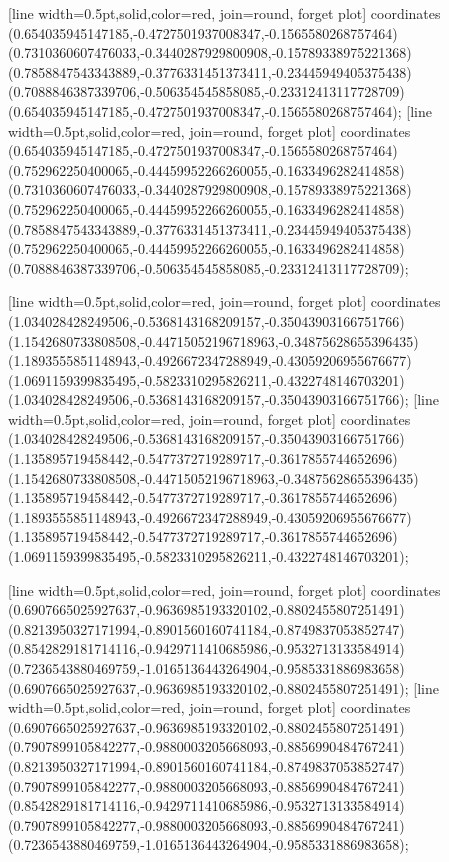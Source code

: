 [line width=0.5pt,solid,color=red, join=round, forget plot] coordinates {(0.654035945147185,-0.4727501937008347,-0.1565580268757464) (0.7310360607476033,-0.3440287929800908,-0.15789338975221368) (0.7858847543343889,-0.3776331451373411,-0.23445949405375438) (0.7088846387339706,-0.506354545858085,-0.23312413117728709) (0.654035945147185,-0.4727501937008347,-0.1565580268757464)};
[line width=0.5pt,solid,color=red, join=round, forget plot] coordinates {(0.654035945147185,-0.4727501937008347,-0.1565580268757464) (0.752962250400065,-0.44459952266260055,-0.1633496282414858) (0.7310360607476033,-0.3440287929800908,-0.15789338975221368) (0.752962250400065,-0.44459952266260055,-0.1633496282414858) (0.7858847543343889,-0.3776331451373411,-0.23445949405375438) (0.752962250400065,-0.44459952266260055,-0.1633496282414858) (0.7088846387339706,-0.506354545858085,-0.23312413117728709)};

[line width=0.5pt,solid,color=red, join=round, forget plot] coordinates {(1.034028428249506,-0.5368143168209157,-0.35043903166751766) (1.1542680733808508,-0.44715052196718963,-0.34875628655396435) (1.1893555851148943,-0.4926672347288949,-0.43059206955676677) (1.0691159399835495,-0.5823310295826211,-0.4322748146703201) (1.034028428249506,-0.5368143168209157,-0.35043903166751766)};
[line width=0.5pt,solid,color=red, join=round, forget plot] coordinates {(1.034028428249506,-0.5368143168209157,-0.35043903166751766) (1.135895719458442,-0.5477372719289717,-0.3617855744652696) (1.1542680733808508,-0.44715052196718963,-0.34875628655396435) (1.135895719458442,-0.5477372719289717,-0.3617855744652696) (1.1893555851148943,-0.4926672347288949,-0.43059206955676677) (1.135895719458442,-0.5477372719289717,-0.3617855744652696) (1.0691159399835495,-0.5823310295826211,-0.4322748146703201)};

[line width=0.5pt,solid,color=red, join=round, forget plot] coordinates {(0.6907665025927637,-0.9636985193320102,-0.8802455807251491) (0.8213950327171994,-0.8901560160741184,-0.8749837053852747) (0.8542829181714116,-0.9429711410685986,-0.9532713133584914) (0.7236543880469759,-1.0165136443264904,-0.9585331886983658) (0.6907665025927637,-0.9636985193320102,-0.8802455807251491)};
[line width=0.5pt,solid,color=red, join=round, forget plot] coordinates {(0.6907665025927637,-0.9636985193320102,-0.8802455807251491) (0.7907899105842277,-0.9880003205668093,-0.8856990484767241) (0.8213950327171994,-0.8901560160741184,-0.8749837053852747) (0.7907899105842277,-0.9880003205668093,-0.8856990484767241) (0.8542829181714116,-0.9429711410685986,-0.9532713133584914) (0.7907899105842277,-0.9880003205668093,-0.8856990484767241) (0.7236543880469759,-1.0165136443264904,-0.9585331886983658)};

